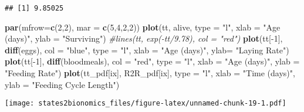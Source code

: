 \documentclass[]{article}
\newenvironment{Shaded}{\begin{snugshade}}{\end{snugshade}}
\newcommand{\KeywordTok}[1]{\textcolor[rgb]{0.13,0.29,0.53}{\textbf{{#1}}}}
\newcommand{\DataTypeTok}[1]{\textcolor[rgb]{0.13,0.29,0.53}{{#1}}}
\newcommand{\DecValTok}[1]{\textcolor[rgb]{0.00,0.00,0.81}{{#1}}}
\newcommand{\StringTok}[1]{\textcolor[rgb]{0.31,0.60,0.02}{{#1}}}
\newcommand{\CommentTok}[1]{\textcolor[rgb]{0.56,0.35,0.01}{\textit{{#1}}}}
\newcommand{\NormalTok}[1]{{#1}}
\begin{document}
\begin{verbatim}
## [1] 9.85025
\end{verbatim}

\begin{Shaded}
\begin{Highlighting}[]
\KeywordTok{par}\NormalTok{(}\DataTypeTok{mfrow=}\KeywordTok{c}\NormalTok{(}\DecValTok{2}\NormalTok{,}\DecValTok{2}\NormalTok{), }\DataTypeTok{mar =} \KeywordTok{c}\NormalTok{(}\DecValTok{5}\NormalTok{,}\DecValTok{4}\NormalTok{,}\DecValTok{2}\NormalTok{,}\DecValTok{2}\NormalTok{))}
\KeywordTok{plot}\NormalTok{(tt, alive, }\DataTypeTok{type =} \StringTok{"l"}\NormalTok{, }\DataTypeTok{xlab =} \StringTok{"Age (days)"}\NormalTok{, }\DataTypeTok{ylab =} \StringTok{"Surviving"}\NormalTok{)}
\CommentTok{#lines(tt, exp(-tt/9.78), col = "red")}
\KeywordTok{plot}\NormalTok{(tt[-}\DecValTok{1}\NormalTok{], }\KeywordTok{diff}\NormalTok{(eggs), }\DataTypeTok{col =} \StringTok{"blue"}\NormalTok{, }\DataTypeTok{type =} \StringTok{"l"}\NormalTok{, }\DataTypeTok{xlab =} \StringTok{"Age (days)"}\NormalTok{, }\DataTypeTok{ylab=} \StringTok{"Laying Rate"}\NormalTok{)}
\KeywordTok{plot}\NormalTok{(tt[-}\DecValTok{1}\NormalTok{], }\KeywordTok{diff}\NormalTok{(bloodmeals), }\DataTypeTok{col =} \StringTok{"red"}\NormalTok{, }\DataTypeTok{type =} \StringTok{"l"}\NormalTok{, }\DataTypeTok{xlab =} \StringTok{"Age (days)"}\NormalTok{, }\DataTypeTok{ylab =} \StringTok{"Feeding Rate"}\NormalTok{)}
\KeywordTok{plot}\NormalTok{(tt_pdf[ix], R2R_pdf[ix], }\DataTypeTok{type =} \StringTok{"l"}\NormalTok{, }\DataTypeTok{xlab =} \StringTok{"Time (days)"}\NormalTok{, }\DataTypeTok{ylab =} \StringTok{"Feeding Cycle Length"}\NormalTok{)}
\end{Highlighting}
\end{Shaded}

\texttt{[image: states2bionomics\_files/figure-latex/unnamed-chunk-19-1.pdf]}
\end{document}
